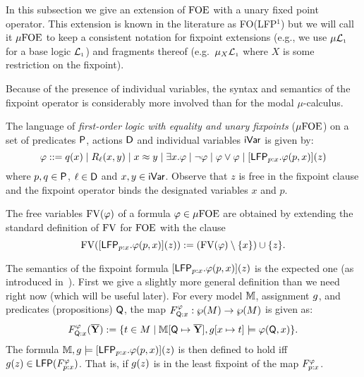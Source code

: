 

In this subsection we give an extension of $\mathrm{FOE}$ with a unary fixed point operator. This extension is known in the literature as FO(LFP$^1$) but we will call it $\mu\mathrm{FOE}$ %
to keep a consistent notation for fixpoint extensions (e.g., we use $\mu\mathcal{L}_{\scriptscriptstyle 1}$ for a base logic $\mathcal{L}_{\scriptscriptstyle 1}$) and fragments thereof (e.g.~$\mu_X\mathcal{L}_{\scriptscriptstyle 1}$ where $X$ is some restriction on the fixpoint).
%

Because of the presence of individual variables, the syntax and semantics of the fixpoint operator is considerably more involved than for the modal $\mu$-calculus.


\begin{definition}
The language of \emph{first-order logic with equality and unary fixpoints} ($\mu\mathrm{FOE}$) on a set of predicates $\mathsf{P}$, actions $\mathsf{D}$ and individual variables $\mathsf{iVar}$ is given by:\[
\varphi ::= q(x) \mid R_\ell(x,y) \mid x \approx y \mid \exists x.\varphi \mid \lnot\varphi \mid \varphi \lor \varphi \mid [\mathsf{LFP}_{p{:}x}.\varphi(p,x)](z)
\]
where $p,q\in\mathsf{P}$, $\ell\in\mathsf{D}$ and $x,y\in\mathsf{iVar}$.
Observe that $z$ is free in the fixpoint clause and the fixpoint operator binds the designated variables $x$ and $p$.
\end{definition}

The free variables $\textup{FV}(\varphi)$ of a formula $\varphi\in\mu\mathrm{FOE}$ are obtained by extending the standard definition of $\textup{FV}$ for $\mathrm{FOE}$ with the clause 
\[\textup{FV}([\mathsf{LFP}_{p{:}x}.\varphi(p,x)](z)) := (\textup{FV}(\varphi) \setminus \{x\}) \cup \{z\}.\]


The semantics of the fixpoint formula $[\mathsf{LFP}_{p{:}x}.\varphi(p,x)](z)$ is the expected one (as introduced in~\cite{Chandra1982,Moschovakis2008,MoschovakisOrig}). First we give a slightly more general definition than we need right now (which will be useful later). For every model $\mathbb{M}$, assignment $g$, and predicates (propositions) $\mathsf{Q}$, the map $F^{\varphi}_{\mathsf{Q}{:}x}:\wp(M)\to \wp(M)$ is given as:
\[
F^{\varphi}_{\mathsf{Q}{:}x}(\overline{{\mathbf{Y}}}) := \{t \in M \mid \mathbb{M}[\mathsf{Q} \mapsto \overline{{\mathbf{Y}}}],g[x\mapsto t] \models \varphi(\mathsf{Q}, x) \}.
\]
%
The formula $\mathbb{M},g \models [\mathsf{LFP}_{p{:}x}.\varphi(p,x)](z)$ is then defined to hold iff $g(z) \in \mathsf{LFP}(F^{\varphi}_{p{:}x})$. That is, if $g(z)$ is in the least fixpoint of the map $F^{\varphi}_{p{:}x}$.


